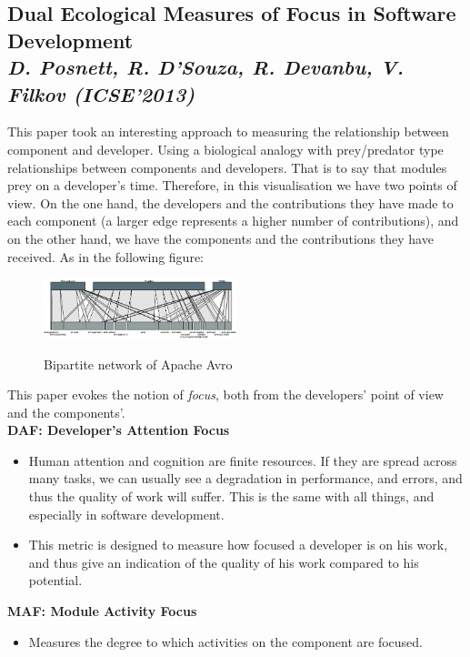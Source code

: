 \subsection{Dual Ecological Measures of Focus in Software Development\\ \textit{D. Posnett, R. D'Souza, R. Devanbu, V. Filkov (ICSE'2013)}}

This paper took an interesting approach to measuring the relationship between component and developer. Using a biological analogy with prey/predator type relationships between components and developers\cite{Posnett}. That is to say that modules prey on a developer's time. Therefore, in this visualisation we have two points of view. On the one hand, the developers and the contributions they have made to each component (a larger edge represents a higher number of contributions), and on the other hand, we have the components and the contributions they have received. As in the following figure:

\begin{figure}[H]
\centering
\includegraphics[width=0.5\textwidth]{./resources/focus.png}~
\caption{Bipartite network of Apache Avro}
\label{fig:focus}
\end{figure}

This paper evokes the notion of \emph{focus}, both from the developers' point of view and the components'.
\\[0.4cm]
\textbf{DAF: Developer's Attention Focus}
\begin{itemize}
\item Human attention and cognition are finite resources. If they are spread across many tasks, we can usually see a degradation in performance, and errors, and thus the quality of work will suffer. This is the same with all things, and especially in software development.
\item This metric is designed to measure how focused a developer is on his work, and thus give an indication of the quality of his work compared to his potential.
\end{itemize}

\textbf{MAF: Module Activity Focus}
\begin{itemize}
\item Measures the degree to which activities on the component are focused.
\end{itemize}

